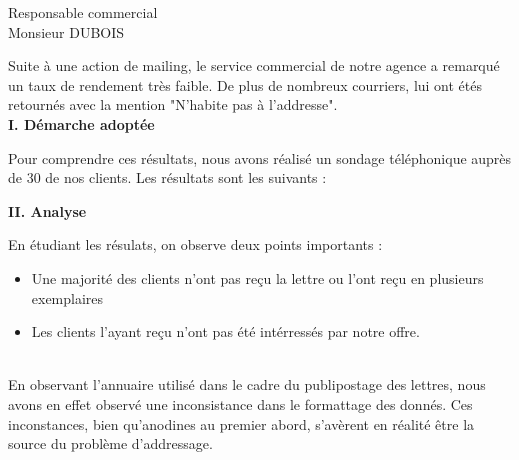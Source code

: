 \documentclass[12pt]{lettre}
\makeatletter
\newcommand*{\NoRule}{\renewcommand*{\rule@length}{0}}
\newcommand{\slice}[4]{
  \pgfmathparse{0.5*#1+0.5*#2}
  \let\midangle\pgfmathresult

  \draw[thick,fill=black!10] (0,0) -- (#1:1) arc (#1:#2:1) -- cycle;

  \node[label=#4] at (\midangle:1.5) {};

  \pgfmathparse{min((#2-#1-10)/110*(-0.3),0)}
  \let\temp\pgfmathresult
  \pgfmathparse{max(\temp,-0.5) + 0.8}
  \let\innerpos\pgfmathresult
  \node at (\midangle:\innerpos) {#3};
}
\makeatother
\begin{document}
\begin{letter}{Responsable commercial\\ Monsieur DUBOIS\\}
	\address{Agence de voyage HAVAS}
	\nofax
	\date{le 3 f\'evrier 2020}
    \notelephone
\NoRule

\opening{}

Suite \`a une action de mailing, le service commercial de notre agence a remarqu\'e un taux de rendement tr\`es faible. De plus de nombreux courriers, lui ont \'et\'es retourn\'es avec la mention "N'habite pas \`a l'addresse".\\

\textbf{I. D\'emarche adopt\'ee}

Pour comprendre ces r\'esultats, nous avons r\'ealis\'e un sondage t\'el\'ephonique aupr\`es de 30 de nos clients. Les r\'esultats sont les suivants : 

\begin{center}
\end{center}

\textbf{II. Analyse}

En \'etudiant les r\'esulats, on observe deux points importants : 
\begin{itemize}
\item Une majorit\'e des clients n'ont pas re\c{c}u la lettre ou l'ont re\c{c}u en plusieurs exemplaires
\item Les clients l'ayant re\c{c}u n'ont pas \'et\'e int\'erress\'es par notre offre.
\end{itemize}
\hfill \\

En observant l'annuaire utilis\'e dans le cadre du publipostage des lettres, nous avons en effet observ\'e une inconsistance dans le formattage des donn\'es. Ces inconstances, bien qu'anodines au premier abord, s'av\`erent en r\'ealit\'e \^{e}tre la source du probl\`eme d'addressage.


\end{letter}
\end{document}
